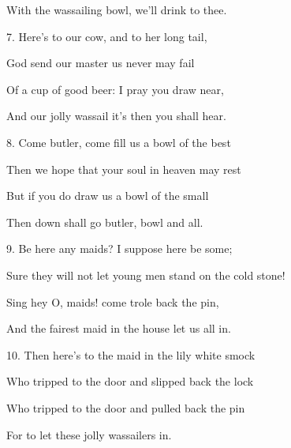 \begin{description}[nosep,leftmargin=\parindent,labelsep=0pt]
\item With the wassailing bowl, we'll drink to thee. 
\vspace{1.5ex}
\item 7. Here's to our cow, and to her long tail, 
\item God send our master us never may fail 
\item Of a cup of good beer: I pray you draw near, 
\item And our jolly wassail it's then you shall hear. 
\vspace{1.5ex}
\item 8. Come butler, come fill us a bowl of the best 
\item Then we hope that your soul in heaven may rest 
\item But if you do draw us a bowl of the small 
\item Then down shall go butler, bowl and all. 
\vspace{1.5ex}
\item 9. Be here any maids? I suppose here be some; 
\item Sure they will not let young men stand on the cold stone! 
\item Sing hey O, maids! come trole back the pin, 
\item And the fairest maid in the house let us all in. 
\vspace{1.5ex}
\item 10. Then here's to the maid in the lily white smock 
\item Who tripped to the door and slipped back the lock 
\item Who tripped to the door and pulled back the pin 
\item For to let these jolly wassailers in. 
\end{description}

